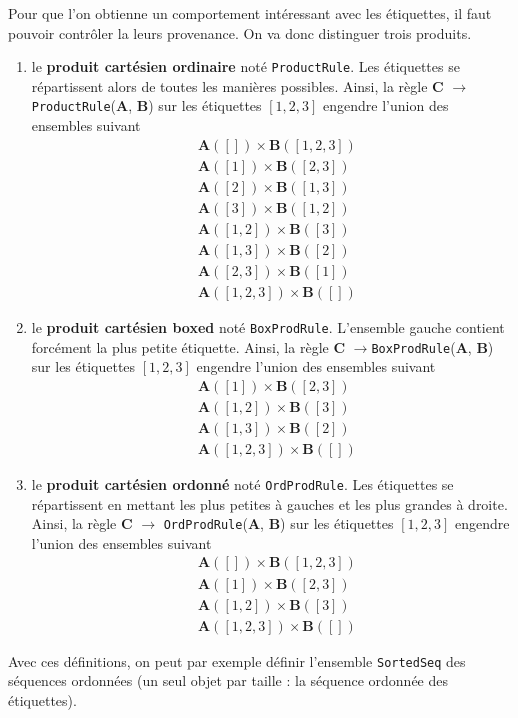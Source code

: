 \documentclass[11pt]{article}
\newcommand{\ProductRule}{\texttt{ProductRule}\xspace}
\newcommand{\BoxProdRule}{\texttt{BoxProdRule}\xspace}
\newcommand{\OrdProdRule}{\texttt{OrdProdRule}\xspace}
\begin{document}
Pour que l'on obtienne un comportement intéressant avec les étiquettes, il
faut pouvoir contrôler la leurs provenance. On va donc distinguer trois
produits.
\begin{enumerate}
\item le \textbf{produit cartésien ordinaire} noté \ProductRule. Les
  étiquettes se répartissent alors de toutes les manières possibles. Ainsi,
  la règle \textbf{C} $\rightarrow$ \ProductRule(\textbf{A}, \textbf{B})
  sur les étiquettes $[1,2,3]$ engendre l'union des ensembles suivant
\begin{align*}
&\textbf{A}([]) \times \textbf{B}([1,2,3]) \\
 &\textbf{A}([1]) \times \textbf{B}([2,3]) \\
 &\textbf{A}([2]) \times \textbf{B}([1,3]) \\
 &\textbf{A}([3]) \times \textbf{B}([1,2]) \\
 &\textbf{A}([1,2]) \times \textbf{B}([3]) \\
 &\textbf{A}([1,3]) \times \textbf{B}([2]) \\
 &\textbf{A}([2,3]) \times \textbf{B}([1]) \\
 &\textbf{A}([1,2,3]) \times \textbf{B}([])
\end{align*}

\item le \textbf{produit cartésien boxed} noté \BoxProdRule.
L'ensemble gauche contient forcément la plus petite étiquette.
Ainsi, la règle \textbf{C} $\rightarrow$\BoxProdRule(\textbf{A}, \textbf{B})
  sur les étiquettes $[1,2,3]$ engendre l'union des ensembles suivant
\begin{align*}
 &\textbf{A}([1]) \times \textbf{B}([2,3]) \\
 &\textbf{A}([1,2]) \times \textbf{B}([3]) \\
 &\textbf{A}([1,3]) \times \textbf{B}([2]) \\
 &\textbf{A}([1,2,3]) \times \textbf{B}([])
\end{align*}
\item le \textbf{produit cartésien ordonné} noté \OrdProdRule. Les
  étiquettes se répartissent en mettant les plus petites à gauches et les plus
  grandes à droite. Ainsi, la règle \textbf{C} $\rightarrow$
  \OrdProdRule(\textbf{A}, \textbf{B}) sur les étiquettes $[1,2,3]$ engendre
  l'union des ensembles suivant
\begin{align*}
&\textbf{A}([]) \times \textbf{B}([1,2,3]) \\
 &\textbf{A}([1]) \times \textbf{B}([2,3]) \\
 &\textbf{A}([1,2]) \times \textbf{B}([3]) \\
 &\textbf{A}([1,2,3]) \times \textbf{B}([])
\end{align*}
\end{enumerate}
Avec ces définitions, on peut par exemple définir l'ensemble
\texttt{SortedSeq} des séquences ordonnées (un seul objet par taille : la
séquence ordonnée des étiquettes).
\end{document}
